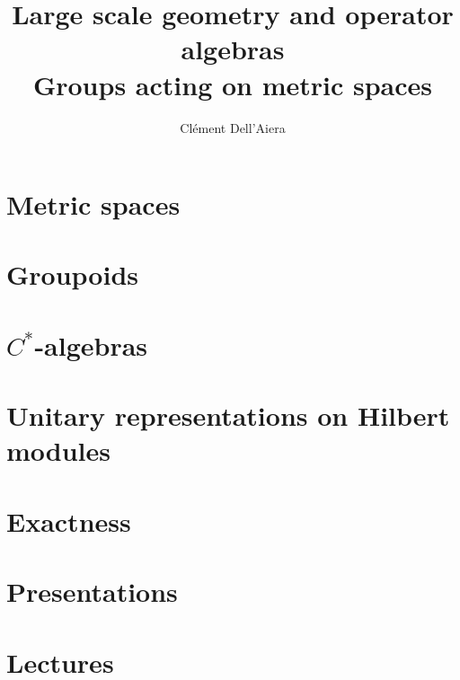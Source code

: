 \documentclass[a4paper,12pt]{book}
\title{\textbf{Large scale geometry and operator algebras}\\ Groups acting on metric spaces}
\date{}
\author{ Clément Dell'Aiera}
\begin{document}
\maketitle

\pagestyle{plain}
\tableofcontents

\pagestyle{fancy}
\chapter{Metric spaces}


\chapter{Groupoids}


\chapter{$C^*$-algebras}


\chapter{Unitary representations on Hilbert modules}


\chapter{Exactness}


\chapter{Presentations}


\chapter{Lectures}



 
\end{document}
